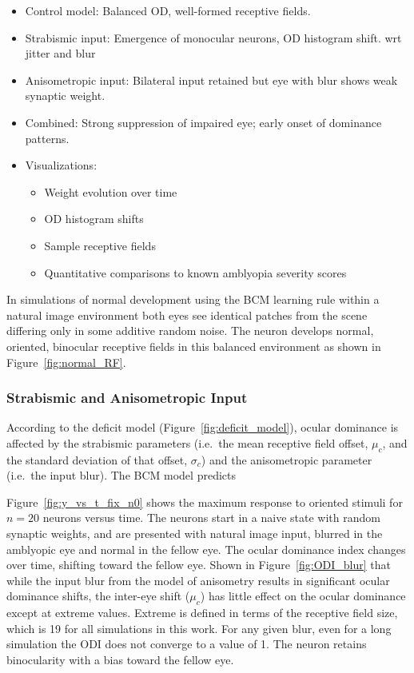 \documentclass[
]{article}
\providecommand{\tightlist}{%
  \setlength{\itemsep}{0pt}\setlength{\parskip}{0pt}}
\begin{document}
\begin{itemize}
\tightlist
\item[$\boxtimes$]
  Control model: Balanced OD, well-formed receptive fields.
\item[$\boxtimes$]
  Strabismic input: Emergence of monocular neurons, OD histogram shift.
  wrt jitter and blur
\item[$\boxtimes$]
  Anisometropic input: Bilateral input retained but eye with blur shows
  weak synaptic weight.
\item[$\boxtimes$]
  Combined: Strong suppression of impaired eye; early onset of dominance
  patterns.
\item[$\boxtimes$]
  Visualizations:

  \begin{itemize}
  \tightlist
  \item[$\boxtimes$]
    Weight evolution over time
  \item[$\boxtimes$]
    OD histogram shifts
  \item[$\boxtimes$]
    Sample receptive fields
  \item[$\boxtimes$]
    Quantitative comparisons to known amblyopia severity scores
  \end{itemize}
\end{itemize}

In simulations of normal development using the BCM learning rule within
a natural image environment both eyes see identical patches from the
scene differing only in some additive random noise. The neuron develops
normal, oriented, binocular receptive fields in this balanced
environment as shown in Figure~\ref{fig:normal_RF}.

\subsubsection{Strabismic and Anisometropic
Input}\label{sec:strabismic-and-anisometropic-input}

According to the deficit model (Figure~\ref{fig:deficit_model}), ocular
dominance is affected by the strabismic parameters (i.e.~the mean
receptive field offset, \(\mu_c\), and the standard deviation of that
offset, \(\sigma_c\)) and the anisometropic parameter (i.e.~the input
blur). The BCM model predicts

Figure~\ref{fig:y_vs_t_fix_n0} shows the maximum response to oriented
stimuli for \(n=20\) neurons versus time. The neurons start in a naive
state with random synaptic weights, and are presented with natural image
input, blurred in the amblyopic eye and normal in the fellow eye. The
ocular dominance index changes over time, shifting toward the fellow
eye. Shown in Figure~\ref{fig:ODI_blur} that while the input blur from
the model of anisometry results in significant ocular dominance shifts,
the inter-eye shift (\(\mu_c\)) has little effect on the ocular
dominance except at extreme values. Extreme is defined in terms of the
receptive field size, which is 19 for all simulations in this work. For
any given blur, even for a long simulation the ODI does not converge to
a value of 1. The neuron retains binocularity with a bias toward the
fellow eye.
\end{document}
